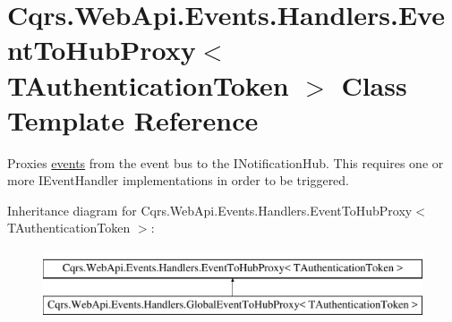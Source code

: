 \hypertarget{classCqrs_1_1WebApi_1_1Events_1_1Handlers_1_1EventToHubProxy}{}\section{Cqrs.\+Web\+Api.\+Events.\+Handlers.\+Event\+To\+Hub\+Proxy$<$ T\+Authentication\+Token $>$ Class Template Reference}
\label{classCqrs_1_1WebApi_1_1Events_1_1Handlers_1_1EventToHubProxy}


Proxies \hyperlink{}{events} from the event bus to the I\+Notification\+Hub. This requires one or more I\+Event\+Handler implementations in order to be triggered.  


Inheritance diagram for Cqrs.\+Web\+Api.\+Events.\+Handlers.\+Event\+To\+Hub\+Proxy$<$ T\+Authentication\+Token $>$\+:\begin{figure}[H]
\begin{center}
\leavevmode
\includegraphics[height=2.000000cm]{classCqrs_1_1WebApi_1_1Events_1_1Handlers_1_1EventToHubProxy}
\end{center}
\end{figure}
